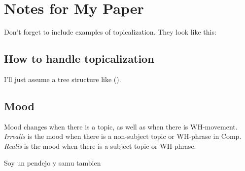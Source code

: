 \documentclass[12pt]{article}
\begin{document}
\section*{Notes for My Paper}

Don't forget to include examples of topicalization.
They look like this:

{\small
{}
}

\subsection*{How to handle topicalization}

I'll just assume a tree structure like ().

{\small
{}
}

\subsection*{Mood}

Mood changes when there is a topic, as well as when
there is WH-movement.  \emph{Irrealis} is the mood when
there is a non-subject topic or WH-phrase in Comp.
\emph{Realis} is the mood when there is a subject topic
or WH-phrase.

Soy un pendejo y samu tambien
\end{document}
